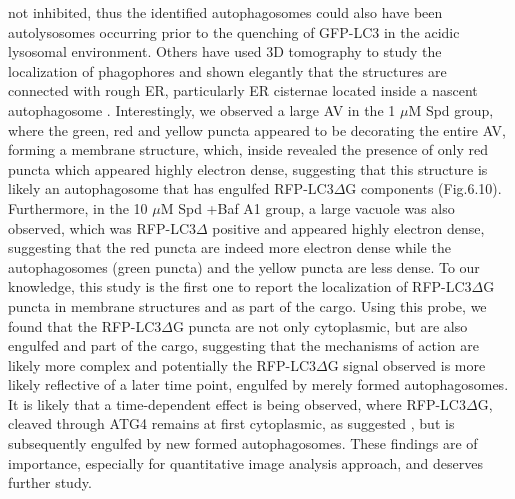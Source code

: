 not inhibited, thus the identified autophagosomes could also have been autolysosomes occurring prior to the quenching of GFP-LC3 in the acidic lysosomal environment. Others have used 3D tomography to study the localization of phagophores and shown elegantly that the structures are connected with rough ER, particularly ER cisternae located inside a nascent autophagosome \citep{Yla-Anttila2009}. Interestingly, we observed a large AV in the 1 $\mu$M Spd group, where the green, red and yellow puncta appeared to be decorating the entire AV, forming a membrane structure, which, inside revealed the presence of only red puncta which appeared highly electron dense, suggesting that this structure is likely an autophagosome that has engulfed RFP-LC3$\Delta$G components (Fig.6.10). Furthermore, in the 10 $\mu$M Spd +Baf A1 group, a large vacuole was also observed, which was RFP-LC3$\Delta$ positive and appeared highly electron dense, suggesting that the red puncta are indeed more electron dense while the autophagosomes (green puncta) and the yellow puncta are less dense. To our knowledge, this study is the first one to report the localization of RFP-LC3$\Delta$G puncta in membrane structures and as part of the cargo. Using this probe, we found that the RFP-LC3$\Delta$G puncta are not only cytoplasmic, but are also engulfed and part of the cargo, suggesting that the mechanisms of action are likely more complex and potentially the RFP-LC3$\Delta$G signal observed is more likely reflective of a later time point, engulfed by merely formed autophagosomes. It is likely that a time-dependent effect is being observed, where RFP-LC3$\Delta$G, cleaved  through ATG4 remains at first cytoplasmic, as suggested \citep{Kaizuka2016}, but is subsequently engulfed by new formed autophagosomes. These findings are of importance, especially for quantitative image analysis approach, and deserves further study.

